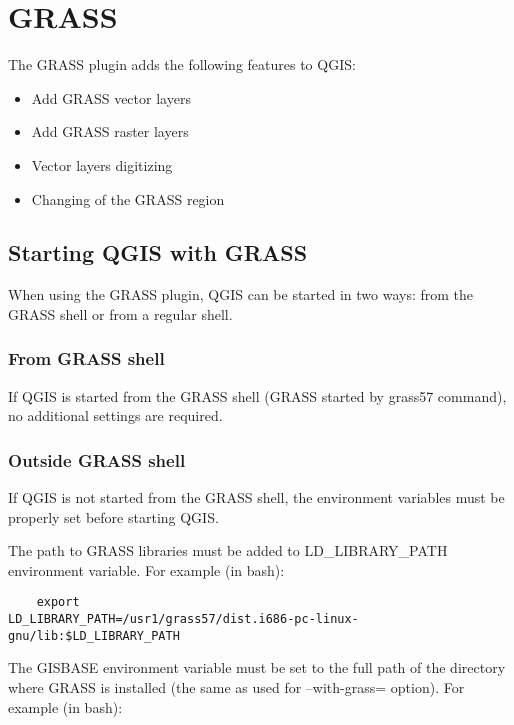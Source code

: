 \section{GRASS}\label{sec:grass}

The GRASS plugin adds the following features to QGIS:

\begin{itemize}
\item Add GRASS vector layers
\item Add GRASS raster layers
\item Vector layers digitizing
\item Changing of the GRASS region
\end{itemize}

\subsection{Starting QGIS with GRASS}\label{sec:starting_grass}

When using the GRASS plugin, QGIS can be started in two ways: from the GRASS
shell or from a regular shell.

\subsubsection{From GRASS shell}\label{label_grassshell}

If QGIS is started from the GRASS shell (GRASS started by grass57 command), no
additional settings are required. 

\subsubsection{Outside GRASS shell}\label{label_outsideshell}

If QGIS is not started from the GRASS shell, the environment variables must be
properly set before starting QGIS.
 
The path to GRASS libraries must be added to LD\_LIBRARY\_PATH environment
variable. For example (in bash): 

\begin{verbatim}
    export
LD_LIBRARY_PATH=/usr1/grass57/dist.i686-pc-linux-gnu/lib:$LD_LIBRARY_PATH
\end{verbatim}    
 
The GISBASE environment variable must be set to the full path of the directory
where GRASS is installed (the same as used for --with-grass= option). For
example (in bash):

